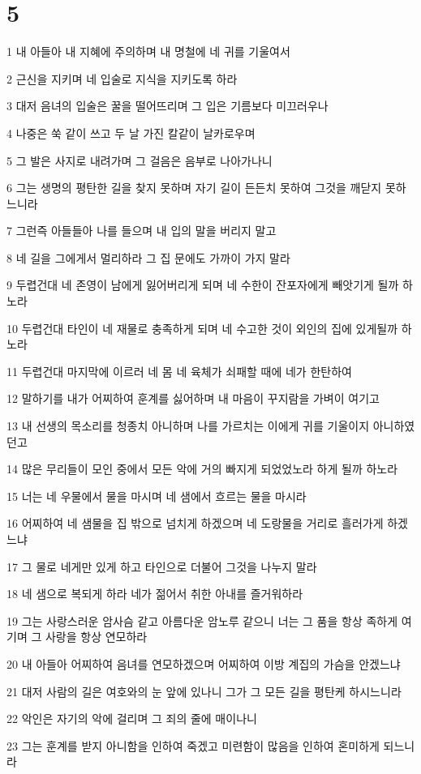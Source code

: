 \chapter{5}

\par 1 내 아들아 내 지혜에 주의하며 내 명철에 네 귀를 기울여서
\par 2 근신을 지키며 네 입술로 지식을 지키도록 하라
\par 3 대저 음녀의 입술은 꿀을 떨어뜨리며 그 입은 기름보다 미끄러우나
\par 4 나중은 쑥 같이 쓰고 두 날 가진 칼같이 날카로우며
\par 5 그 발은 사지로 내려가며 그 걸음은 음부로 나아가나니
\par 6 그는 생명의 평탄한 길을 찾지 못하며 자기 길이 든든치 못하여 그것을 깨닫지 못하느니라
\par 7 그런즉 아들들아 나를 들으며 내 입의 말을 버리지 말고
\par 8 네 길을 그에게서 멀리하라 그 집 문에도 가까이 가지 말라
\par 9 두렵건대 네 존영이 남에게 잃어버리게 되며 네 수한이 잔포자에게 빼앗기게 될까 하노라
\par 10 두렵건대 타인이 네 재물로 충족하게 되며 네 수고한 것이 외인의 집에 있게될까 하노라
\par 11 두렵건대 마지막에 이르러 네 몸 네 육체가 쇠패할 때에 네가 한탄하여
\par 12 말하기를 내가 어찌하여 훈계를 싫어하며 내 마음이 꾸지람을 가벼이 여기고
\par 13 내 선생의 목소리를 청종치 아니하며 나를 가르치는 이에게 귀를 기울이지 아니하였던고
\par 14 많은 무리들이 모인 중에서 모든 악에 거의 빠지게 되었었노라 하게 될까 하노라
\par 15 너는 네 우물에서 물을 마시며 네 샘에서 흐르는 물을 마시라
\par 16 어찌하여 네 샘물을 집 밖으로 넘치게 하겠으며 네 도랑물을 거리로 흘러가게 하겠느냐
\par 17 그 물로 네게만 있게 하고 타인으로 더불어 그것을 나누지 말라
\par 18 네 샘으로 복되게 하라 네가 젊어서 취한 아내를 즐거워하라
\par 19 그는 사랑스러운 암사슴 같고 아름다운 암노루 같으니 너는 그 품을 항상 족하게 여기며 그 사랑을 항상 연모하라
\par 20 내 아들아 어찌하여 음녀를 연모하겠으며 어찌하여 이방 계집의 가슴을 안겠느냐
\par 21 대저 사람의 길은 여호와의 눈 앞에 있나니 그가 그 모든 길을 평탄케 하시느니라
\par 22 악인은 자기의 악에 걸리며 그 죄의 줄에 매이나니
\par 23 그는 훈계를 받지 아니함을 인하여 죽겠고 미련함이 많음을 인하여 혼미하게 되느니라

